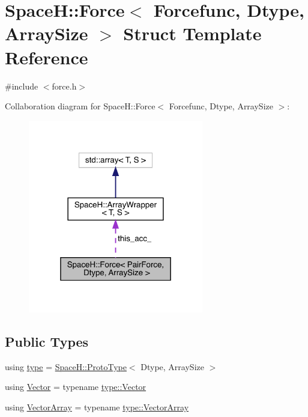 \hypertarget{struct_space_h_1_1_force}{}\section{SpaceH\+:\+:Force$<$ Forcefunc, Dtype, Array\+Size $>$ Struct Template Reference}
\label{struct_space_h_1_1_force}


{\ttfamily \#include $<$force.\+h$>$}



Collaboration diagram for SpaceH\+:\+:Force$<$ Forcefunc, Dtype, Array\+Size $>$\+:\nopagebreak
\begin{figure}[H]
\begin{center}
\leavevmode
\includegraphics[width=217pt]{struct_space_h_1_1_force__coll__graph}
\end{center}
\end{figure}
\subsection*{Public Types}
\begin{DoxyCompactItemize}
\item 
using \mbox{\hyperlink{struct_space_h_1_1_force_a151c6ae1ec7ad87825c2b6cc74aee5f2}{type}} = \mbox{\hyperlink{struct_space_h_1_1_proto_type}{Space\+H\+::\+Proto\+Type}}$<$ Dtype, Array\+Size $>$
\item 
using \mbox{\hyperlink{struct_space_h_1_1_force_a7da326c7793f559bb39c73b6d0d01e39}{Vector}} = typename \mbox{\hyperlink{struct_space_h_1_1_proto_type_a316b81f4660b2b4fab14a8e1f23b6089}{type\+::\+Vector}}
\item 
using \mbox{\hyperlink{struct_space_h_1_1_force_aa58fd21903006c1d033713d04b4719f3}{Vector\+Array}} = typename \mbox{\hyperlink{struct_space_h_1_1_proto_type_a622b8e122b33bb4966a02299fb7b82d6}{type\+::\+Vector\+Array}}
\end{DoxyCompactItemize}
